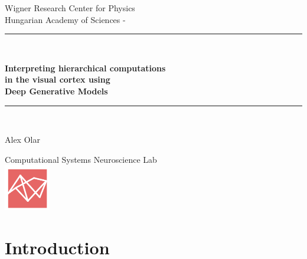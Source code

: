 \documentclass[12pt, english]{article}
\makeatletter
\newcounter{unomenos}
\gdef\@date{ \arabic{unomenos} }
\makeatother
\begin{document}
\begin{titlepage}

\begin{center}
Wigner Research Center for Physics \\ Hungarian Academy of Sciences - \@date\\
\vspace*{0.5in}
\rule{150mm}{0.1mm}\\
\vspace*{0.3in}
\begin{Large}
\textbf{Interpreting hierarchical computations \\ in the visual cortex using\\ Deep Generative Models} \\
\end{Large}
\vspace*{0.3in}
\rule{150mm}{0.1mm}\\
\vspace*{0.4in}
\begin{large}
Alex Olar \\
\end{large}
\vfill
Computational Systems Neuroscience Lab \\
\vspace{2mm}
\includegraphics[width=2cm]{logoFAC.png}
\end{center}
\end{titlepage}

\newcommand{\CC}{C\nolinebreak\hspace{-.05em}\raisebox{.4ex}{\tiny\bf +}\nolinebreak\hspace{-.10em}\raisebox{.4ex}{\tiny\bf +}}
\def\CC{{C\nolinebreak[4]\hspace{-.05em}\raisebox{.4ex}{\tiny\bf ++}}}

\renewcommand{\thesection}{\Roman{section}.}
\renewcommand{\thesubsection}{\Roman{section}. \arabic{subsection}.}
\renewcommand{\thesubsubsection}{\Roman{section}. \arabic{subsection}.\arabic{subsection}.}

\tableofcontents
\newpage

\section{Introduction}
\end{document}
